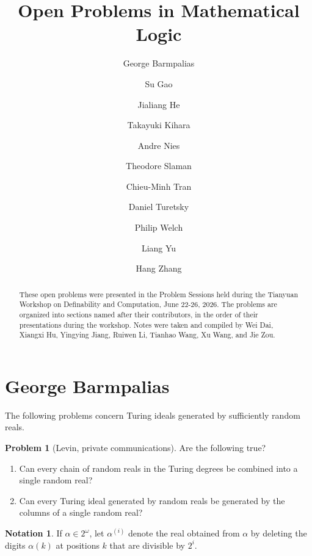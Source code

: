 \documentclass[11pt]{amsart}
\theoremstyle{definition}
\newtheorem{problem}{Problem}[section]
\newtheorem{notation}[theorem]{Notation}
\newcommand{\abstractauthor}[1]{\noindent\textbf{#1}\par\vspace{0.3\baselineskip}}
\newcommand{\abstractbody}[1]{\noindent #1 \par \vspace{\baselineskip}}
\begin{document}
\title[Open Problems in Mathematical Logic]{Open Problems in Mathematical Logic}
\author[2026 Tianyuan Workshop in Definability and Computation]{George Barmpalias}  
\author[]{Su Gao}  
\author[]{Jialiang He}  
\author[]{Takayuki Kihara}  
\author[]{Andre Nies}  
\author[]{Theodore Slaman}  
\author[]{Chieu-Minh Tran}  
\author[]{Daniel Turetsky}  
\author[]{Philip Welch}  
\author[]{Liang Yu}  
\author[]{Hang Zhang}




\begin{abstract}
These open problems were presented in the Problem Sessions held during the Tianyuan Workshop on Definability and Computation, June 22-26, 2026. The problems are organized into sections named after their contributors, in the order of their presentations during the workshop. Notes were taken and compiled by Wei Dai, Xiangxi Hu, Yingying Jiang,  Ruiwen Li, Tianhao Wang, Xu Wang, and Jie Zou.
\end{abstract}
\maketitle
\tableofcontents

\section{George Barmpalias}

The following problems concern Turing ideals generated by sufficiently
random reals.

\begin{problem}[Levin, private communications]
        Are the following true?
    \begin{enumerate}
        \item[(1)] Can every chain of random reals in the Turing degrees
        be combined into a single random real?

        \item[(2)] Can every Turing ideal generated by random reals be
        generated by the columns of a single random real?
    \end{enumerate}
\end{problem}

\begin{notation}
If $\alpha\in 2^\omega$, let $\alpha^{(i)}$ denote the real obtained from
$\alpha$ by deleting the digits $\alpha(k)$ at positions $k$ that are
divisible by $2^i$.
\end{notation}
\end{document}
